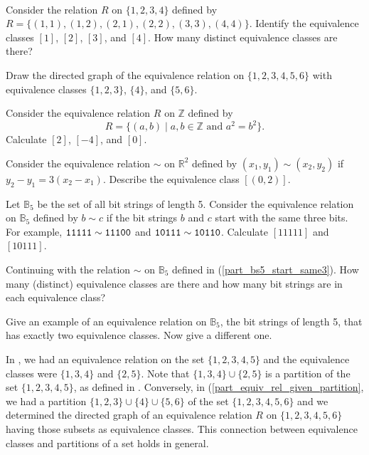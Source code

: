 \begin{act}
\label{act_equiv_classes}
~
    \begin{actpart}
        \item Consider the relation $R$ on $\{1,2,3,4\}$ defined by $R= \{(1,1),(1,2),(2,1),(2,2),(3,3),(4,4)\}$.  Identify the equivalence classes $[1]$, $[2]$, $[3]$, and $[4]$.  How many distinct equivalence classes are there?
        
        \item \label{part_equiv_rel_given_partition} Draw the directed graph of the equivalence relation on $\{1,2,3,4,5,6\}$ with equivalence classes $\{1,2,3\}$, $\{4\}$, and $\{5,6\}$.
        
        \item Consider the equivalence relation $R$ on $\mathbb{Z}$ defined by
            $$R=\{ (a,b) \mid a, b\in \mathbb{Z} \text{ and } a^2 =b^2 \}.$$
        Calculate $[2]$, $[-4]$, and $[0]$.
        
        \item Consider the equivalence relation $\sim$ on $\mathbb{R}^2$ defined by $(x_1,y_1) \sim (x_2,y_2)$ if  $y_2-y_1=3(x_2-x_1)$.  Describe the equivalence class $[(0,2)]$.

        \item \label{part_bs5_start_same3} Let $\mathbb{B}_5$ be the set of all bit strings of length 5.  Consider the equivalence relation on $\mathbb{B}_5$ defined by $b \sim c$ if the bit strings $b$ and $c$ start with the same three bits.  For example, $\texttt{11111} \sim \texttt{11100}$ and $\texttt{10111} \sim \texttt{10110}$.  Calculate $[11111]$ and $[10111]$.  

        \item Continuing with the relation $\sim$ on $\mathbb{B}_5$ defined in (\ref{part_bs5_start_same3}). How many (distinct) equivalence classes are there and how many bit strings are in each equivalence class?

        \item Give an example of an equivalence relation on $\mathbb{B}_5$, the bit strings of length 5, that has exactly two equivalence classes.  Now give a different one.
    \end{actpart}
\end{act}

In , we had an equivalence relation on the set $\{1,2,3,4,5\}$ and the equivalence classes were $\{1,3,4\}$ and $\{2,5\}$.  Note that $\{1,3,4\} \cup \{2,5\}$ is a partition of the set $\{1,2,3,4,5\}$, as defined in .  Conversely, in  (\ref{part_equiv_rel_given_partition}, we had a partition $\{1,2,3\} \cup \{4\} \cup \{5,6\}$ of the set $\{1,2,3,4,5,6\}$ and we determined the directed graph of an equivalence relation $R$ on $\{1,2,3,4,5,6\}$ having those subsets as equivalence classes. This connection between equivalence classes and partitions of a set holds in general.

